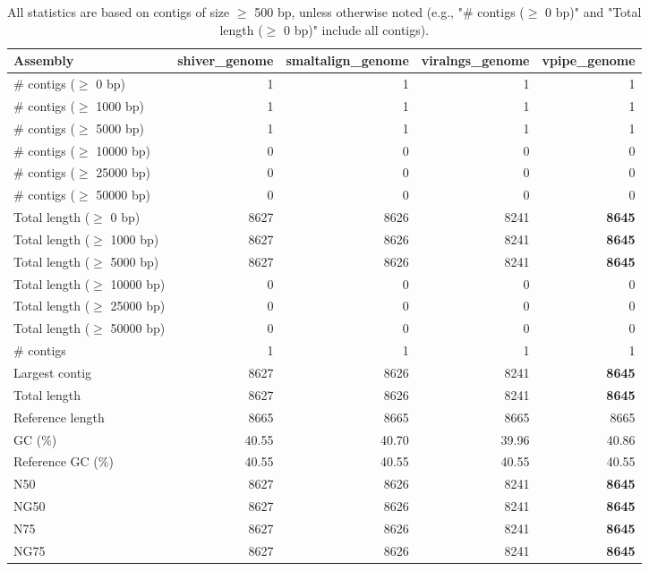 \documentclass[12pt,a4paper]{article}
\begin{document}
\begin{table}[ht]
\begin{center}
\caption{All statistics are based on contigs of size $\geq$ 500 bp, unless otherwise noted (e.g., "\# contigs ($\geq$ 0 bp)" and "Total length ($\geq$ 0 bp)" include all contigs).}
\begin{tabular}{|l*{4}{|r}|}
\hline
Assembly & shiver\_genome & smaltalign\_genome & viralngs\_genome & vpipe\_genome \\ \hline
\# contigs ($\geq$ 0 bp) & 1 & 1 & 1 & 1 \\ \hline
\# contigs ($\geq$ 1000 bp) & 1 & 1 & 1 & 1 \\ \hline
\# contigs ($\geq$ 5000 bp) & 1 & 1 & 1 & 1 \\ \hline
\# contigs ($\geq$ 10000 bp) & 0 & 0 & 0 & 0 \\ \hline
\# contigs ($\geq$ 25000 bp) & 0 & 0 & 0 & 0 \\ \hline
\# contigs ($\geq$ 50000 bp) & 0 & 0 & 0 & 0 \\ \hline
Total length ($\geq$ 0 bp) & 8627 & 8626 & 8241 & {\bf 8645} \\ \hline
Total length ($\geq$ 1000 bp) & 8627 & 8626 & 8241 & {\bf 8645} \\ \hline
Total length ($\geq$ 5000 bp) & 8627 & 8626 & 8241 & {\bf 8645} \\ \hline
Total length ($\geq$ 10000 bp) & 0 & 0 & 0 & 0 \\ \hline
Total length ($\geq$ 25000 bp) & 0 & 0 & 0 & 0 \\ \hline
Total length ($\geq$ 50000 bp) & 0 & 0 & 0 & 0 \\ \hline
\# contigs & 1 & 1 & 1 & 1 \\ \hline
Largest contig & 8627 & 8626 & 8241 & {\bf 8645} \\ \hline
Total length & 8627 & 8626 & 8241 & {\bf 8645} \\ \hline
Reference length & 8665 & 8665 & 8665 & 8665 \\ \hline
GC (\%) & 40.55 & 40.70 & 39.96 & 40.86 \\ \hline
Reference GC (\%) & 40.55 & 40.55 & 40.55 & 40.55 \\ \hline
N50 & 8627 & 8626 & 8241 & {\bf 8645} \\ \hline
NG50 & 8627 & 8626 & 8241 & {\bf 8645} \\ \hline
N75 & 8627 & 8626 & 8241 & {\bf 8645} \\ \hline
NG75 & 8627 & 8626 & 8241 & {\bf 8645} \\ \hline

\end{tabular}
\end{center}
\end{table}
\end{document}

